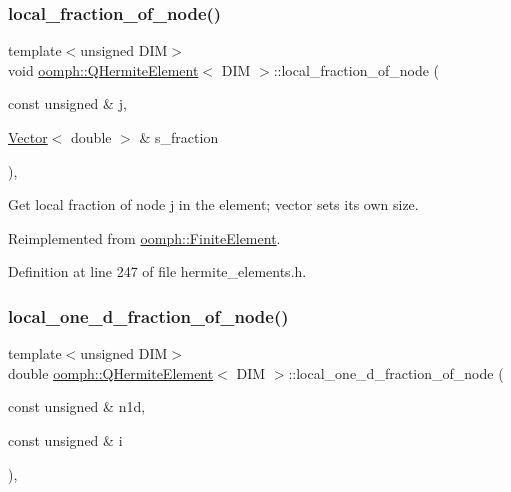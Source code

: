 \subsubsection{\texorpdfstring{local\+\_\+fraction\+\_\+of\+\_\+node()}{local\_fraction\_of\_node()}}
{\footnotesize\ttfamily template$<$unsigned D\+IM$>$ \\
void \hyperlink{classoomph_1_1QHermiteElement}{oomph\+::\+Q\+Hermite\+Element}$<$ D\+IM $>$\+::local\+\_\+fraction\+\_\+of\+\_\+node (\begin{DoxyParamCaption}\item[{const unsigned \&}]{j,  }\item[{\hyperlink{classoomph_1_1Vector}{Vector}$<$ double $>$ \&}]{s\+\_\+fraction }\end{DoxyParamCaption})\hspace{0.3cm}{\ttfamily [inline]}, {\ttfamily [virtual]}}



Get local fraction of node j in the element; vector sets its own size. 



Reimplemented from \hyperlink{classoomph_1_1FiniteElement_a41640b9a9e5f6461cd8ebb8218502b07}{oomph\+::\+Finite\+Element}.



Definition at line 247 of file hermite\+\_\+elements.\+h.

\mbox{\label{classoomph_1_1QHermiteElement_a08477703be4ee27e1883f320c098298c}} 
\subsubsection{\texorpdfstring{local\+\_\+one\+\_\+d\+\_\+fraction\+\_\+of\+\_\+node()}{local\_one\_d\_fraction\_of\_node()}}
{\footnotesize\ttfamily template$<$unsigned D\+IM$>$ \\
double \hyperlink{classoomph_1_1QHermiteElement}{oomph\+::\+Q\+Hermite\+Element}$<$ D\+IM $>$\+::local\+\_\+one\+\_\+d\+\_\+fraction\+\_\+of\+\_\+node (\begin{DoxyParamCaption}\item[{const unsigned \&}]{n1d,  }\item[{const unsigned \&}]{i }\end{DoxyParamCaption})\hspace{0.3cm}{\ttfamily [inline]}, {\ttfamily [virtual]}}



